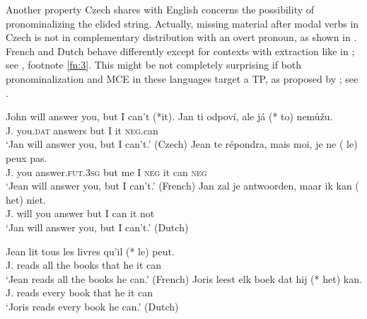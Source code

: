 \documentclass[output=paper,colorlinks,citecolor=brown,
modfonts
]{langscibook}
\begin{document}
\noindent Another property Czech shares with English concerns the possibility of pronominalizing the elided string. Actually, missing material after modal verbs in Czech is not in complementary distribution with an overt pronoun, as shown in . French and Dutch behave differently except for contexts with extraction like in ; see , footnote \ref{fn:3}. This might be not completely surprising if both pronominalization and MCE in these languages target a TP, as proposed by \citet{Dagnac2010}; see .


\begin{exe}
\ex \label{20}
\begin{xlist}
\ex \label{20a} John will answer you, but I can't (*it).
\ex \label{20b}
\gll Jan  ti    odpoví, ale  já (*\hspace{-2pt} to) nemůžu.\\
J.    you.\textsc{dat} answers but I       {} it   \textsc{neg}.can\\
\glt `Jan will answer you, but I can't.' \hfill (Czech)
\ex \label{20c}
\gll   Jean te    répondra,  mais moi, je ne  (\hspace{-2pt} le) peux pas. \\
J.  you answer.\textsc{fut}.\textsc{3sg} but me I \textsc{neg} {} it can \textsc{neg}\\
\glt `Jean will answer you, but I can't.' \hfill (French)
\ex \label{20d}
\gll  Jan zal je antwoorden, maar ik kan (\hspace{-2pt} het) niet.\\
J. will you answer but I can {} it not\\
\glt `Jan will answer you, but I can't.' \hfill (Dutch)
\end{xlist}
\ex \label{21}
\begin{xlist}
\ex \label{21a}
\gll  Jean  lit tous les livres  qu'il   (*\hspace{-2pt} le) peut.\\
J.  reads all  the books {that he}   {} it   can \\
\glt `Jean reads all the books he can.' \hfill (French)
\ex \label{21b} 
\gll  Joris leest  elk  boek dat hij (*\hspace{-2pt} het) kan.\\
J.   reads every book that he     {} it    can \\
\glt `Joris reads every book he can.' \hfill (Dutch)
\end{xlist}
\end{exe}
\end{document}
